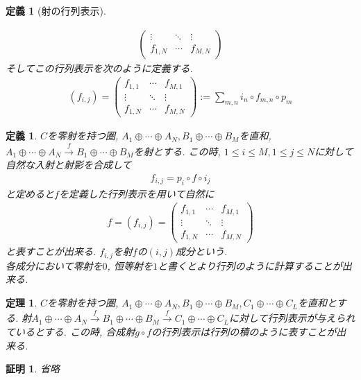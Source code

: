 \documentclass[a4paper,12pt]{ltjsarticle}
\theoremstyle{break}
\newtheorem{defn}[thm]{定義}
\newtheorem{thrm}[thm]{定理}
\newtheorem*{prf}{証明}
\newcommand{\xr}[1]{\xrightarrow{#1}}
\newcommand{\ci}{\circ}
\newcommand{\opl}{\oplus}
\numberwithin{equation}{section}
\begin{document}
\begin{defn}[射の行列表示]
\begin{itemize}
\begin{align*}
\begin{pmatrix}
        \vdots & \ddots & \vdots \\
        f_{1,N} & \cdots  & f_{M,N}
      \end{pmatrix}
    \end{align*}
    そしてこの行列表示を次のように定義する. 
    \begin{align*}
      (f_{i,j})= 
      \begin{pmatrix}
        f_{1,1} & \cdots & f_{M,1} \\
        \vdots & \ddots & \vdots \\
        f_{1,N} & \cdots  & f_{M,N}
      \end{pmatrix}
      := \sum_{m,n} i_n \ci f_{m,n} \ci p_m
    \end{align*}
  \end{itemize}
\end{defn}

\begin{defn}
  $C$を零射を持つ圏, $A_1 \opl \cdots \opl A_N, B_1 \opl \cdots \opl B_M$を直和, $A_1 \opl \cdots \opl A_N \xr{f} B_1 \opl \cdots \opl B_M$を射とする. 
  この時, $1 \leq i \leq M, 1 \leq j \leq N$に対して自然な入射と射影を合成して
  \begin{align*}
    f_{i,j}=p_i \ci f \ci i_j
  \end{align*}
  と定めると$f$を定義した行列表示を用いて自然に
  \begin{align*}
    f=(f_{i,j})
    =\begin{pmatrix}
      f_{1,1} & \cdots & f_{M,1} \\
      \vdots & \ddots & \vdots \\
      f_{1,N} & \cdots  & f_{M,N}
    \end{pmatrix}
  \end{align*}
  と表すことが出来る. 
  $f_{i,j}$を射$f$の$(i,j)$成分という. \\
  各成分において零射を$0$, 恒等射を$1$と書くとより行列のように計算することが出来る. 
\end{defn}

\begin{thrm}
  $C$を零射を持つ圏, $A_1 \opl \cdots \opl A_N, B_1 \opl \cdots \opl B_M, C_1 \opl \cdots \opl C_L$を直和とする. 
  射$A_1 \opl \cdots \opl A_N \xr{f} B_1 \opl \cdots \opl B_M \xr{f} C_1 \opl \cdots \opl C_L$に対して行列表示が与えられているとする. 
  この時, 合成射$g \ci f$の行列表示は行列の積のように表すことが出来る. 
\end{thrm}

\begin{prf}
  省略
\end{prf}
\end{document}
